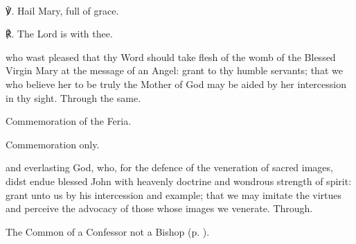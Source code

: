 	
\secondEvensong
{}\\
	
	℣. Hail Mary, full of grace.

	℟. The Lord is with thee.


\collect
{} who wast pleased that thy Word should take flesh of the womb of the Blessed Virgin Mary at the message of an Angel: grant to thy humble servants; that we who believe her to be truly the Mother of God may be aided by her intercession in thy sight. Through the same.
\begin{rubric}
    Commemoration of the Feria.%
\end{rubric}



\begin{rubric}
	Commemoration only.
\end{rubric}


{} and everlasting God, who, for the defence of the veneration of sacred images, didst endue blessed John with heavenly doctrine and wondrous strength of spirit: grant unto us by his intercession and example; that we may imitate the virtues and perceive the advocacy of those whose images we venerate. Through.



\begin{rubric}
	The Common of a Confessor not a Bishop (p. \pageref{AbbotCollect}).
\end{rubric}


